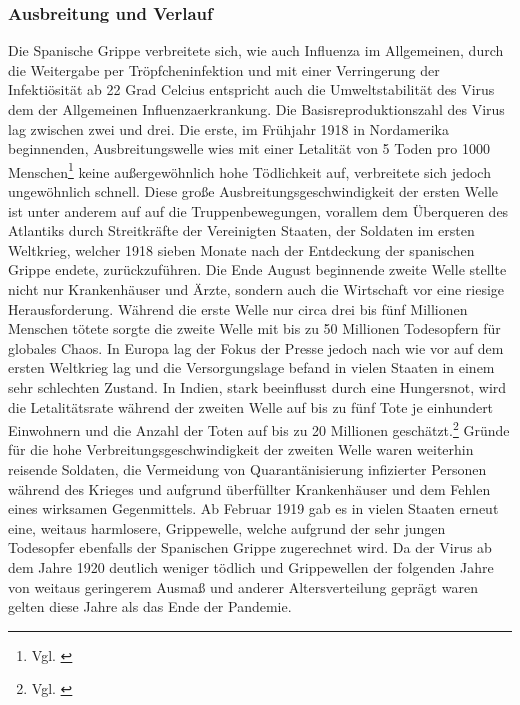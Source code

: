 \documentclass[12pt]{article}
\begin{document}
\subsubsection{Ausbreitung und Verlauf}
Die Spanische Grippe verbreitete sich, wie auch Influenza im Allgemeinen, durch die Weitergabe per Tröpfcheninfektion und mit einer Verringerung der Infektiösität ab 22 Grad Celcius entspricht auch die Umweltstabilität des Virus dem der Allgemeinen Influenzaerkrankung. Die Basisreproduktionszahl des Virus lag zwischen zwei und drei. Die erste, im Frühjahr 1918 in Nordamerika beginnenden, Ausbreitungswelle wies mit einer Letalität von 5 Toden pro 1000 Menschen\footnote{Vgl. \cite{Jeff06}} keine außergewöhnlich hohe Tödlichkeit auf, verbreitete sich jedoch ungewöhnlich schnell. Diese große Ausbreitungsgeschwindigkeit der ersten Welle ist unter anderem auf auf die Truppenbewegungen, vorallem dem Überqueren des Atlantiks durch Streitkräfte der Vereinigten Staaten, der Soldaten im ersten Weltkrieg, welcher 1918 sieben Monate nach der Entdeckung der spanischen Grippe endete, zurückzuführen. 
Die Ende August beginnende zweite Welle stellte nicht nur Krankenhäuser und Ärzte, sondern auch die Wirtschaft vor eine riesige Herausforderung. Während die erste Welle nur circa drei bis fünf Millionen Menschen tötete sorgte die zweite Welle mit bis zu 50 Millionen Todesopfern für globales Chaos. In Europa lag der Fokus der Presse jedoch nach wie vor auf dem ersten Weltkrieg lag und die Versorgungslage befand in vielen Staaten in einem sehr schlechten Zustand. In Indien, stark beeinflusst durch eine Hungersnot,  wird die Letalitätsrate während der zweiten Welle auf bis zu fünf Tote je einhundert Einwohnern und die Anzahl der Toten auf bis zu 20 Millionen geschätzt.\footnote{Vgl. \cite{Bax20}} Gründe für die hohe Verbreitungsgeschwindigkeit der zweiten Welle waren weiterhin reisende Soldaten, die Vermeidung von Quarantänisierung infizierter Personen während des Krieges und aufgrund überfüllter Krankenhäuser und dem Fehlen eines wirksamen Gegenmittels.
Ab Februar 1919 gab es in vielen Staaten erneut eine, weitaus harmlosere, Grippewelle, welche aufgrund der sehr jungen Todesopfer ebenfalls der Spanischen Grippe zugerechnet wird. Da der Virus ab dem Jahre 1920 deutlich weniger tödlich und Grippewellen der folgenden Jahre von weitaus geringerem Ausmaß und anderer Altersverteilung geprägt waren gelten diese Jahre als das Ende der Pandemie.
\end{document}
